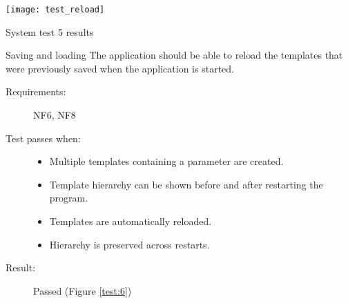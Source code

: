 \begin{marginfigure}
	\texttt{[image: test\_reload]}
	\caption{System test 5 results}
	\label{test:6}
\end{marginfigure}

\begin{test}[label={test_camera}]{Saving and loading}
The application should be able to reload the templates that were previously saved when the application is started.
\tcbline
	\begin{description}
		\item[Requirements:] NF6, NF8
		\item[Test passes when:] \hfill
			\begin{itemize}
				\item Multiple templates containing a parameter are created.
				\item Template hierarchy can be shown before and after restarting the program.
				\item Templates are automatically reloaded.
				\item Hierarchy is preserved across restarts.
			\end{itemize}
		\item[Result:] Passed (Figure \ref{test:6})
	\end{description}
\end{test}
